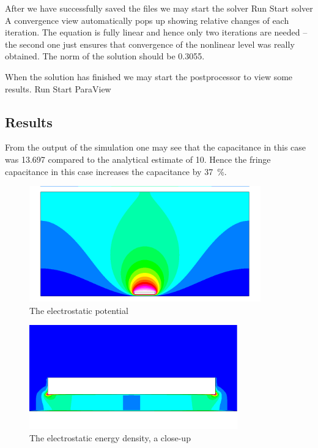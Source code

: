After we have successfully saved the files we may start the solver
\ttbegin
Run
  Start solver
\ttend
A convergence view automatically pops up showing relative changes of each iteration.
The equation is fully linear and hence only two iterations are needed -- the second 
one just ensures that convergence of the nonlinear level was really obtained. 
The norm of the solution should be 0.3055.

When the solution has finished we may start the postprocessor to view some results.
\ttbegin
Run
  Start ParaView
\ttend


\subsection*{Results}

From the output of the simulation one may see that the 
capacitance in this case was 13.697 compared to the analytical estimate of 10. 
Hence the fringe capacitance in this case increases the capacitance by 37~\%. 

\begin{figure}[h]
\centering
\includegraphics[width=10cm, viewport=0 20 1024 480,clip]{potential}
\caption{The electrostatic potential}\label{fg:es_potential}
\end{figure} 

\begin{figure}[h]
\centering
\includegraphics[width=9cm, viewport=0 20 1024 480,clip]{energy}
\caption{The electrostatic energy density, a close-up}\label{fg:es_energy}
\end{figure} 


\hfill

